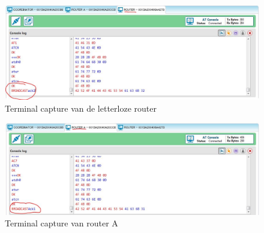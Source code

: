 \documentclass[12pt]{article}
\begin{document}
\begin{center}
\begin{figure}[h]
\includegraphics[scale=.7]{rout_capture.JPG}
\caption{Terminal capture van de letterloze router}
\label{fig:output5}
\end{figure}
\end{center}
\begin{center}
\begin{figure}[h]
\includegraphics[scale=.7]{routA_capture.JPG}
\caption{Terminal capture van router A}
\label{fig:output6}
\end{figure}
\end{center}
\clearpage
\end{document}
